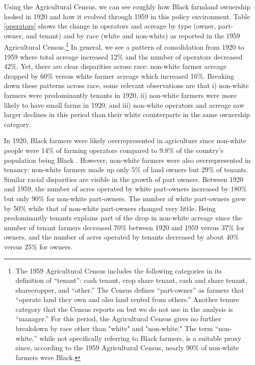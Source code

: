 \documentclass[12pt]{article}
\begin{document}
Using the Agricultural Census, we can see roughly how Black farmland ownership looked in 1920 and how it evolved through 1959 in this policy environment.
Table \ref{operators} shows the change in operators and acreage by type (owner, part-owner, and tenant) and by race (white and non-white) as reported in the 1959 Agricultural Census.\footnote{The 1959 Agricultural Census includes the following categories in its definition of ``tenant'': cash tenant, crop share tenant, cash and share tenant, sharecropper, and ``other.'' The Census defines ``part-owner'' as farmers that ``operate land they own and also land rented from others.'' Another tenure category that the Census reports on but we do not use in the analysis is ``manager.'' For this period, the Agricultural Census gives no further breakdown by race other than "white" and "non-white." The term ``non-white,'' while not specifically referring to Black farmers, is a suitable proxy since, according to the 1959 Agricultural Census, nearly 90\% of non-white farmers were Black. }
In general, we see a pattern of consolidation from 1920 to 1959 where total acreage increased 12\% and the number of operators decreased 42\%.
Yet, there are clear disparities across race: non-white farmer acreage dropped by 60\% versus white farmer acreage which increased 16\%.
Breaking down these patterns across race, some relevant observations are that i) non-white farmers were predominantly tenants in 1920, ii) non-white farmers were more likely to have small farms in 1920, and iii) non-white operators and acreage saw larger declines in this period than their white counterparts in the same ownership category. 

In 1920, Black farmers were likely overrepresented in agriculture since non-white people were 14\% of farming operators compared to 9.8\% of the country's population being Black \citep{Census1921}.
However, non-white farmers were also overrepresented in tenancy: non-white farmers made up only 5\% of land owners but 29\% of tenants. 
Similar racial disparities are visible in the growth of part owners. 
Between 1920 and 1959, the number of acres operated by white part-owners increased by 180\% but only 90\% for non-white part-owners. 
The number of white part-owners grew by 50\% while that of non-white part-owners changed very little. 
Being predominantly tenants explains part of the drop in non-white acreage since the number of tenant farmers decreased 70\% between 1920 and 1959 versus 37\% for owners, and the number of acres operated by tenants decreased by about 40\% versus 25\% for owners.
\end{document}
